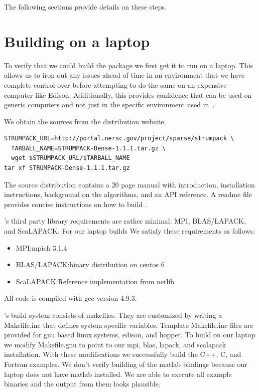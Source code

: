 \documentclass{acmsmall}
\begin{document}
The following sections provide details on these steps.


\section{Building \strumpack{} on a laptop}

To verify that we could build the package we first get it to run
on a laptop.  This allows us to iron out any issues ahead of time
in an environment that we have complete control over before
attempting to do the same on an expensive computer like Edison.
Additionally, this provides confidence that \strumpack{} can be
used on generic computers and not just in the specific
environment used in~\cite{rouet:strumpack}.

We obtain the sources from the \strumpack{} distribution website,
\begin{verbatim}
STRUMPACK_URL=http://portal.nersc.gov/project/sparse/strumpack \
  TARBALL_NAME=STRUMPACK-Dense-1.1.1.tar.gz \
  wget $STRUMPACK_URL/$TARBALL_NAME
tar xf STRUMPACK-Dense-1.1.1.tar.gz
\end{verbatim}

The source distribution contains a 20 page manual with
introduction, installation instructions, background on the
algorithms, and an API reference.  A readme file
provides concise instructions on how to build \strumpack{}.

\strumpack{}'s third party library requirements are rather
minimal: MPI, BLAS/LAPACK, and ScaLAPACK.  For our laptop builds
We satisfy these requirements as follows:
\begin{itemize}
\item MPI:\@ mpich  3.1.4
\item BLAS/LAPACK:\@ binary distribution on centos 6
\item ScaLAPACK:\@ Reference implementation from netlib~\cite{netlib}
\end{itemize}

All code is compiled with gcc version 4.9.3.

\strumpack{}'s build system consists of makefiles.  They are
customized by writing a Makefile.inc that defines system specific
variables.  Template Makefile.inc files are provided for gnu
based linux systems, edison, and hopper.  To build on our laptop
we modify Makefile.gnu to point to our mpi, blas, lapack, and
scalapack installation.  With these modifications we successfully
build the C++, C, and Fortran examples.  We don't verify building
of the matlab bindings because our laptop does not have matlab
installed.  We are able to execute all example binaries and the
output from them looks plausible.
\end{document}
